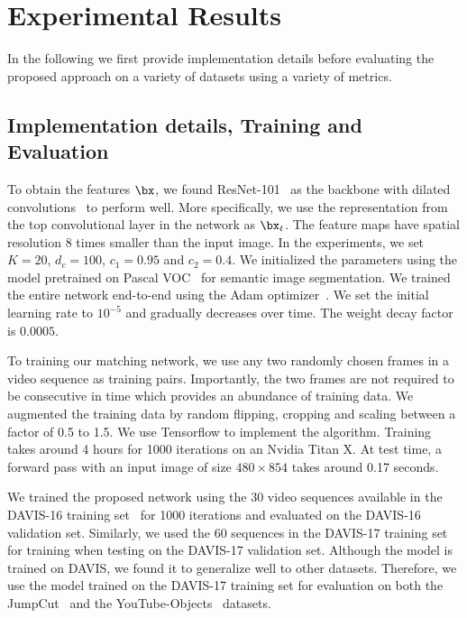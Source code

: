 

\section{Experimental Results}
In the following we first provide implementation details before evaluating the proposed approach on a variety of datasets using a variety of metrics.

\subsection{Implementation details, Training and Evaluation}

To obtain the features $\bx$, we found ResNet-101~\cite{HeCVPR16} as the backbone with dilated convolutions~\cite{ChenArxiv16} to perform well. More specifically, we use the representation from the top convolutional layer in the network as $\bx_t$. The feature maps have spatial resolution 8 times smaller than the input image. In the experiments, we set $K=20$, $d_c=100$, $c_1=0.95$ and $c_2=0.4$. We initialized the parameters using the model pretrained on Pascal VOC~\cite{EveringhamIJCV15,HariharanICCV11} for semantic image segmentation. We trained the entire network end-to-end using the Adam optimizer~\cite{kingma2014adam}. We set the initial learning rate to $10^{-5}$ and gradually decreases over time. The weight decay factor is $0.0005$.

To training our matching network, we use any two randomly chosen frames in a video sequence as training pairs. Importantly, the two frames are not required to be consecutive in time which provides an abundance of training data. We augmented the training data by random flipping, cropping and scaling between a factor of 0.5 to 1.5. We use Tensorflow to implement the algorithm.  Training takes around 4 hours for 1000 iterations  on an Nvidia Titan X. At test time, a forward pass with an input image of size $480\times 854$ takes around 0.17 seconds. 




 We trained the proposed network using the 30 video sequences available in the DAVIS-16 training set~\cite{PerazziCVPR16} for 1000 iterations and evaluated on the DAVIS-16 validation set. Similarly, we used the 60 sequences in the DAVIS-17 training set~\cite{pont2017DAVIS} for training when testing on the DAVIS-17 validation set. Although the model is trained on DAVIS, we found it to generalize well to other datasets. Therefore, we use the model trained on the DAVIS-17 training set for evaluation on both the JumpCut~\cite{FanTOG15} and the YouTube-Objects~\cite{PrestCVPR12} datasets. 

